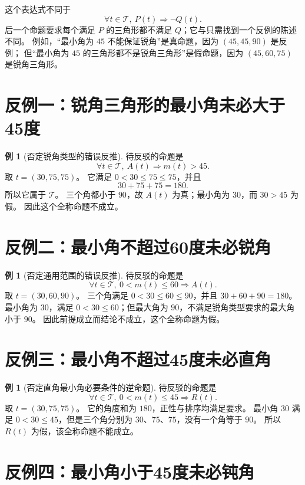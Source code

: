 \documentclass[UTF8,a4paper,zihao=-4,oneside,openany,fontset=fandol]{ctexbook}
\theoremstyle{definition}
\newtheorem{example}[theorem]{例}
\theoremstyle{remark}
\begin{document}
这个表达式不同于
\[
\forall t\in\mathcal T,\ P(t)\Longrightarrow\neg Q(t).
\]
后一个命题要求每个满足 $P$ 的三角形都不满足 $Q$；它与只需找到一个反例的陈述不同。
例如，“最小角为 $45$ 不能保证锐角”是真命题，因为 $(45,45,90)$ 是反例；
但“最小角为 $45$ 的三角形都不是锐角三角形”是假命题，因为 $(45,60,75)$ 是锐角三角形。

\section{反例一：锐角三角形的最小角未必大于45度}

\begin{example}[否定锐角类型的错误反推]
待反驳的命题是
\[
\forall t\in\mathcal T,\ A(t)\Longrightarrow m(t)>45.
\]
取 $t=(30,75,75)$。
它满足 $0<30\le75\le75$，并且
\[
30+75+75=180.
\]
所以它属于 $\mathcal T$。
三个角都小于 $90$，故 $A(t)$ 为真；最小角为 $30$，而 $30>45$ 为假。
因此这个全称命题不成立。
\end{example}

\section{反例二：最小角不超过60度未必锐角}

\begin{example}[否定通用范围的错误反推]
待反驳的命题是
\[
\forall t\in\mathcal T,\ 0<m(t)\le60\Longrightarrow A(t).
\]
取 $t=(30,60,90)$。
三个角满足 $0<30\le60\le90$，并且 $30+60+90=180$。
最小角为 $30$，满足 $0<30\le60$；但最大角为 $90$，不满足锐角类型要求的最大角小于 $90$。
因此前提成立而结论不成立，这个全称命题为假。
\end{example}

\section{反例三：最小角不超过45度未必直角}

\begin{example}[否定直角最小角必要条件的逆命题]
待反驳的命题是
\[
\forall t\in\mathcal T,\ 0<m(t)\le45\Longrightarrow R(t).
\]
取 $t=(30,75,75)$。
它的角度和为 $180$，正性与排序均满足要求。
最小角 $30$ 满足 $0<30\le45$，但是三个角分别为 $30$、$75$、$75$，没有一个角等于 $90$。
所以 $R(t)$ 为假，该全称命题不能成立。
\end{example}

\section{反例四：最小角小于45度未必钝角}
\end{document}
